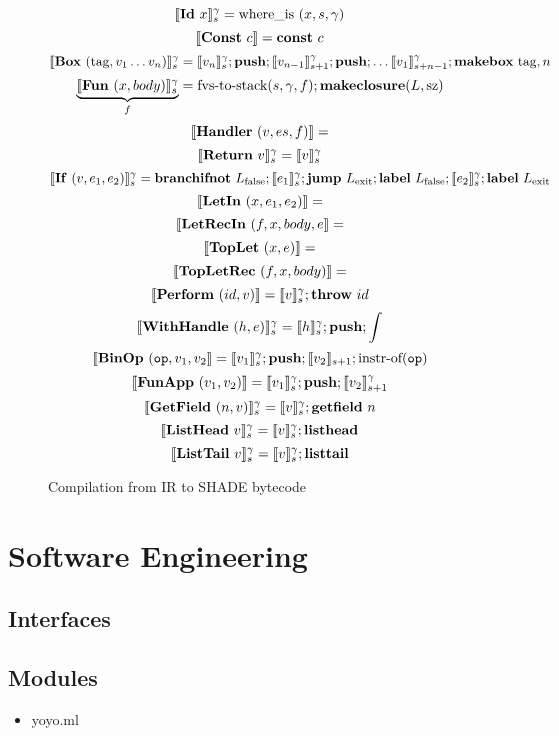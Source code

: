 \documentclass[class=article, crop=false]{standalone}
\begin{document}
\begin{figure}
    $$ \llbracket \mathbf{Id}\ x \rrbracket_s^\gamma = \text{where\_is}\ (x, s, \gamma) $$
    $$ \llbracket \mathbf{Const}\ c \rrbracket = \textbf{const}\ c $$
    $$ \llbracket \mathbf{Box}\ (\mathrm{tag}, v_1 \dots v_n) \rrbracket_s ^ \gamma = \llbracket v_n \rrbracket_s^\gamma; \textbf{push}; \llbracket v_{n-1} \rrbracket_{s+1}^\gamma; \textbf{push}; \dots \llbracket v_1 \rrbracket_{s+n-1}^\gamma; \textbf{makebox}\ \mathrm{tag}, n $$
    $$ \underbrace{\llbracket \mathbf{Fun}\ (x, body) \rrbracket_s ^\gamma }_f = \text{fvs-to-stack} (s, \gamma, f); \textbf{makeclosure} (L, \mathrm{sz}) $$
    $$ \interp{\irHandler\ (v, es, f)} =  $$
    $$ \llbracket \mathbf{Return}\ v \rrbracket_s ^ \gamma =  \llbracket v \rrbracket_s ^ \gamma $$
    $$ \interp{\irIf\ (v, e_1, e_2)}_s ^ \gamma = \vmBranchIfNot\ L_\text{false}; \interp{e_1}_s^\gamma; \vmJump\ L_\text{exit}; \vmLabel\ L_\text{false}; \interp{e_2}_s^\gamma; \vmLabel\ L_\text{exit} $$
    $$ \llbracket \mathbf{LetIn}\ (x, e_1, e_2) \rrbracket =  $$
    $$ \llbracket \mathbf{LetRecIn}\ (f, x, body, e \rrbracket =  $$
    $$ \llbracket \mathbf{TopLet}\ (x, e) \rrbracket =  $$
    $$ \llbracket \mathbf{TopLetRec}\ (f, x, body) \rrbracket =  $$
    $$ \llbracket \mathbf{Perform}\ (id, v) \rrbracket = \llbracket v \rrbracket_s ^ \gamma; \textbf{throw}\ id $$
    $$ \llbracket \mathbf{WithHandle}\ (h, e) \rrbracket_s ^ \gamma = \llbracket h \rrbracket_s ^ \gamma; \textbf{push}; \int$$
    $$ \llbracket \mathbf{BinOp}\ (\mathtt{op}, v_1, v_2 \rrbracket = \llbracket v_1 \rrbracket_s ^ \gamma; \textbf{push}; \llbracket v_2 \rrbracket_{s+1}; \text{instr-of}(\mathtt{op}) $$
    $$ \llbracket \mathbf{FunApp}\ (v_1, v_2) \rrbracket = \llbracket v_1 \rrbracket_s ^ \gamma; \textbf{push}; \llbracket v_2 \rrbracket_{s+1} ^ \gamma $$
    $$ \llbracket \mathbf{GetField}\ (n, v) \rrbracket_s ^ \gamma = \llbracket v \rrbracket_s ^ \gamma; \textbf{getfield}\ n $$
    $$ \llbracket \mathbf{ListHead}\ v \rrbracket_s ^ \gamma = \llbracket v \rrbracket_s ^ \gamma; \textbf{listhead} $$
    $$ \llbracket \mathbf{ListTail}\ v \rrbracket_s ^ \gamma = \llbracket v \rrbracket_s ^ \gamma ; \textbf{listtail} $$

    \caption{Compilation from IR to SHADE bytecode}
    \label{compilation}
\end{figure}

\section{Software Engineering}

\subsection{Interfaces}
\subsection{Modules}
\begin{itemize}
    \item yoyo.ml
\end{itemize}
\end{document}
